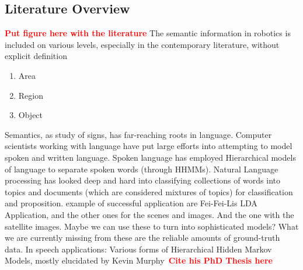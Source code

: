 \documentclass[twocolumn,letterpaper]{IEEEAerospaceCLS}  %
\newcommand\todo[1]{\textbf{\textcolor{red}{#1}}}
\begin{document}
\subsection{Literature Overview} \label{ssec:ResLit}
\todo{Put figure here with the literature}
The semantic information in robotics is included on various levels, especially in the contemporary literature, without explicit definition
\begin{enumerate}
    \item Area
    \item Region
    \item Object
\end{enumerate}
Semantics, as study of signs, has far-reaching roots in language. Computer scientists working with language have put large efforts into attempting to model spoken and written language. Spoken language has employed Hierarchical models of language to separate spoken words (through HHMMs). Natural Language processing has looked deep and hard into classifying collections of words into topics and documents (which are considered mixtures of topics) for classification and proposition.
example of successful application are Fei-Fei-Lis LDA Application, and the other ones for the scenes and images. And the one with the satellite images. Maybe we can use these to turn into sophisticated models?
What we are currently missing from these are the reliable amounts of ground-truth data.
In speech applications: Various forms of Hierarchical Hidden Markov Models, mostly elucidated by Kevin Murphy~\todo{Cite his PhD Thesis here}
\end{document}
